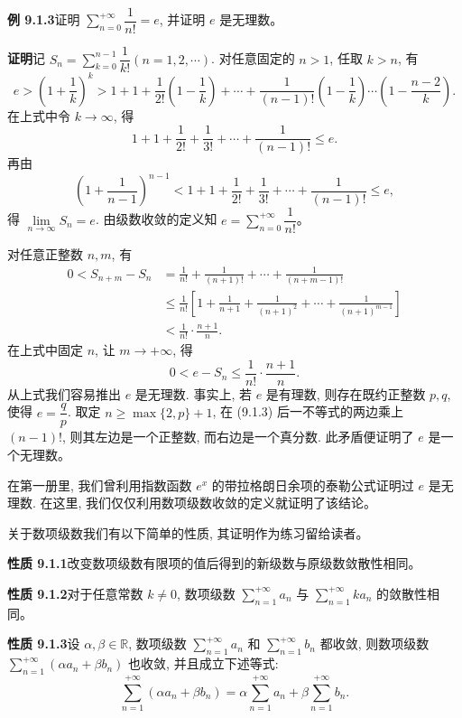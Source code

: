 \documentclass[UTF8,12pt,a4paper,fontset=fandol]{ctexart}
\begin{document}
\noindent\textbf{例 9.1.3}\quad 证明 $\sum\limits_{n=0}^{+\infty}\dfrac1{n!}=e$, 并证明 $e$ 是无理数。

\noindent\textbf{证明}\quad 记 $S_n=\sum\limits_{k=0}^{n-1}\dfrac1{k!}(n=1,2,\cdots)$. 对任意固定的 $n>1$, 任取 $k>n$, 有
\[
  e>\left(1+\frac1k\right)^k
  >1+1+\frac1{2!}\left(1-\frac1k\right)+\cdots+\frac1{(n-1)!}\left(1-\frac1k\right)\cdots\left(1-\frac{n-2}{k}\right).
\]
在上式中令 $k\to\infty$, 得
\[
  1+1+\frac1{2!}+\frac1{3!}+\cdots+\frac1{(n-1)!}\leq e.
\]
再由
\[
  \left(1+\frac1{n-1}\right)^{n-1}<1+1+\frac1{2!}+\frac1{3!}+\cdots+\frac1{(n-1)!}\leq e,
\]
得 $\lim\limits_{n\to\infty}S_n=e$. 由级数收敛的定义知 $e=\sum\limits_{n=0}^{+\infty}\dfrac1{n!}$。

对任意正整数 $n,m$, 有
\[
\begin{aligned}
  0<S_{n+m}-S_n
  &=\frac1{n!}+\frac1{(n+1)!}+\cdots+\frac1{(n+m-1)!}\\
  &\leq\frac1{n!}\left[1+\frac1{n+1}+\frac1{(n+1)^2}+\cdots+\frac1{(n+1)^{m-1}}\right]\\
  &<\frac1{n!}\cdot\frac{n+1}{n}.
\end{aligned}
\]
在上式中固定 $n$, 让 $m\to+\infty$, 得
\begin{equation}
  0<e-S_n\leq\frac1{n!}\cdot\frac{n+1}{n}.
  \tag{9.1.3}
\end{equation}
从上式我们容易推出 $e$ 是无理数. 事实上, 若 $e$ 是有理数, 则存在既约正整数 $p,q$, 使得 $e=\dfrac qp$. 取定 $n\geq\max\{2,p\}+1$, 在 (9.1.3) 后一不等式的两边乘上 $(n-1)!$, 则其左边是一个正整数, 而右边是一个真分数. 此矛盾便证明了 $e$ 是一个无理数。

在第一册里, 我们曾利用指数函数 $e^x$ 的带拉格朗日余项的泰勒公式证明过 $e$ 是无理数. 在这里, 我们仅仅利用数项级数收敛的定义就证明了该结论。

关于数项级数我们有以下简单的性质, 其证明作为练习留给读者。

\noindent\textbf{性质 9.1.1}\quad 改变数项级数有限项的值后得到的新级数与原级数敛散性相同。

\noindent\textbf{性质 9.1.2}\quad 对于任意常数 $k\neq0$, 数项级数 $\sum\limits_{n=1}^{+\infty}a_n$ 与 $\sum\limits_{n=1}^{+\infty}ka_n$ 的敛散性相同。

\noindent\textbf{性质 9.1.3}\quad 设 $\alpha,\beta\in\mathbb R$, 数项级数 $\sum\limits_{n=1}^{+\infty}a_n$ 和 $\sum\limits_{n=1}^{+\infty}b_n$ 都收敛, 则数项级数 $\sum\limits_{n=1}^{+\infty}(\alpha a_n+\beta b_n)$ 也收敛, 并且成立下述等式:
\[
  \sum_{n=1}^{+\infty}(\alpha a_n+\beta b_n)
  =\alpha\sum_{n=1}^{+\infty}a_n+\beta\sum_{n=1}^{+\infty}b_n.
\]
\end{document}
